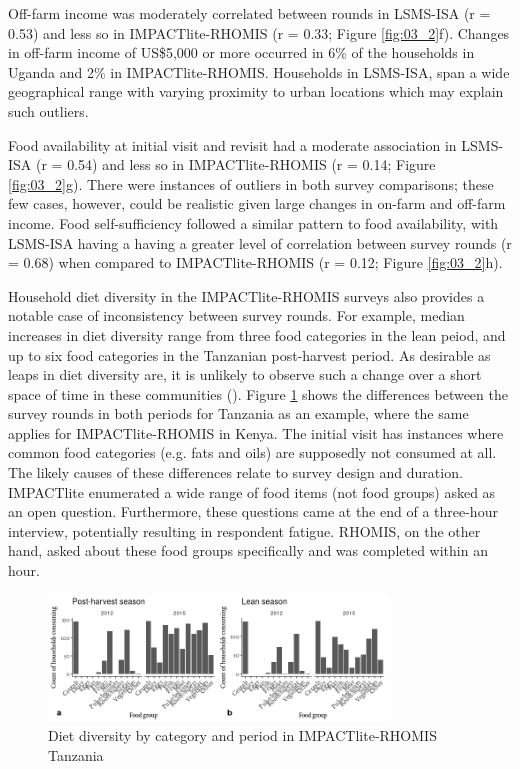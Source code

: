 Off-farm income was moderately correlated between rounds in LSMS-ISA (r = 0.53) and less so in IMPACTlite-RHOMIS (r = 0.33; Figure \ref{fig:03_2}f). Changes in off-farm income of US\$5,000 or more occurred in 6\% of the households in Uganda and 2\% in IMPACTlite-RHOMIS. Households in LSMS-ISA, span a wide geographical range with varying proximity to urban locations which may explain such outliers.

Food availability at initial visit and revisit had a moderate association in LSMS-ISA (r = 0.54) and less so in IMPACTlite-RHOMIS (r = 0.14; Figure \ref{fig:03_2}g). There were instances of outliers in both survey comparisons; these few cases, however, could be realistic given large changes in on-farm and off-farm income. Food self-sufficiency followed a similar pattern to food availability, with LSMS-ISA having a having a greater level of correlation between survey rounds (r = 0.68) when compared to IMPACTlite-RHOMIS (r = 0.12; Figure \ref{fig:03_2}h).

Household diet diversity in the IMPACTlite-RHOMIS surveys also provides a notable case of inconsistency between survey rounds. For example, median increases in diet diversity range from three food categories in the lean peiod, and up to six food categories in the Tanzanian post-harvest period. As desirable as leaps in diet diversity are, it is unlikely to observe such a change over a short space of time in these communities (\citealp{IFAD2016}). Figure \ref{fig:03_3} shows the differences between the survey rounds in both periods for Tanzania as an example, where the same applies for IMPACTlite-RHOMIS in Kenya. The initial visit has instances where common food categories (e.g. fats and oils) are supposedly not consumed at all. The likely causes of these differences relate to survey design and duration. IMPACTlite enumerated a wide range of food items (not food groups) asked as an open question. Furthermore, these questions came at the end of a three-hour interview, potentially resulting in respondent fatigue. RHOMIS, on the other hand, asked about these food groups specifically and was completed within an hour.

\begin{figure}[H]
  \includegraphics[width=0.8\textwidth]{figs_03/image3.png}
  \captionsetup{singlelinecheck = off, justification=justified}
  \caption{Diet diversity by category and period in IMPACTlite-RHOMIS Tanzania}
  \label{fig:03_3}
\end{figure}


